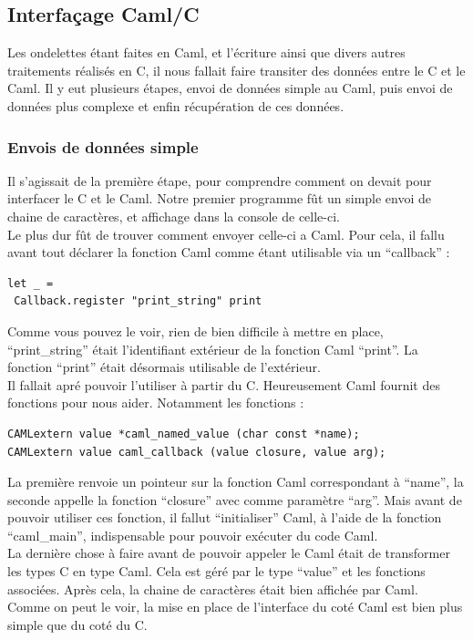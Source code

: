 \documentclass[a4paper,12pt]{article}
\begin{document}
	\subsection{Interfaçage Caml/C}
Les ondelettes étant faites en Caml, et l'écriture ainsi que divers
autres traitements
réalisés en C, il nous fallait faire transiter des données entre le C et le
Caml. Il y eut plusieurs étapes, envoi de données simple au Caml, puis envoi
de données plus complexe et enfin récupération de ces données.\\

		\subsubsection{Envois de données simple}
Il s'agissait de la première étape, pour comprendre comment on devait pour
interfacer le C et le Caml. Notre premier programme fût un simple envoi de
chaine de caractères, et affichage dans la console de celle-ci.\\
Le plus dur fût de trouver comment envoyer celle-ci a Caml. Pour cela, il
fallu avant tout déclarer la fonction Caml comme étant utilisable via un
``callback'' :
\begin{verbatim}
let _ =
 Callback.register "print_string" print
\end{verbatim}
Comme vous pouvez le voir, rien de bien difficile à mettre en place,
``print\_string'' était l'identifiant extérieur de la fonction Caml ``print''.
La fonction ``print'' était désormais utilisable de l'extérieur.\\
Il fallait apr\'e pouvoir l'utiliser à partir du C. Heureusement Caml fournit
des fonctions pour nous aider. Notamment les fonctions :
\begin{verbatim}
CAMLextern value *caml_named_value (char const *name);
CAMLextern value caml_callback (value closure, value arg);
\end{verbatim}
La première renvoie un pointeur sur la fonction Caml correspondant \`a ``name'',
la seconde appelle la fonction ``closure'' avec comme paramètre ``arg''. Mais
avant de pouvoir utiliser ces fonction, il fallut ``initialiser'' Caml, à
l'aide de la fonction ``caml\_main'', indispensable pour pouvoir exécuter du
code Caml.\\
La dernière chose à faire avant de pouvoir appeler le Caml était de transformer
les types C en type Caml. Cela est géré par le type ``value'' et les fonctions
associées. Après cela, la chaine de caractères était bien affichée par Caml.\\
Comme on peut le voir, la mise en place de l'interface du coté Caml est bien
plus simple que du coté du C.\\
\end{document}
